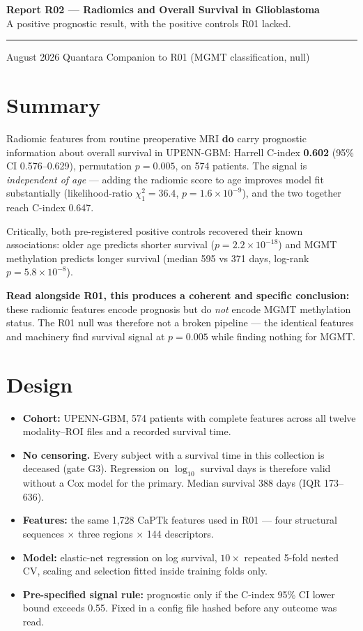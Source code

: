 \documentclass[11pt,a4paper]{article}
\begin{document}
\thispagestyle{empty}
\noindent
{\large\bfseries\color{qnavy} Report R02 --- Radiomics and Overall Survival in Glioblastoma}\\[2pt]
{\color{qgrey}A positive prognostic result, with the positive controls R01 lacked.}\\[6pt]
{\color{qgrey}\rule{\textwidth}{0.4pt}}

\medskip
{} August 2026 \quad\textbullet\quad Quantara \quad\textbullet\quad
Companion to R01 (MGMT classification, null)

\section*{Summary}

Radiomic features from routine preoperative MRI \textbf{do} carry prognostic information
about overall survival in UPENN-GBM: Harrell C-index \textbf{0.602} (95\% CI 0.576--0.629),
permutation $p = 0.005$, on 574 patients. The signal is \emph{independent of age} --- adding
the radiomic score to age improves model fit substantially (likelihood-ratio
$\chi^2_1 = 36.4$, $p = 1.6\times10^{-9}$), and the two together reach C-index 0.647.

Critically, both pre-registered positive controls recovered their known associations: older
age predicts shorter survival ($p = 2.2\times10^{-18}$) and MGMT methylation predicts longer
survival (median 595 vs 371 days, log-rank $p = 5.8\times10^{-8}$).

\textbf{Read alongside R01, this produces a coherent and specific conclusion:} these
radiomic features encode prognosis but do \emph{not} encode MGMT methylation status. The
R01 null was therefore not a broken pipeline --- the identical features and machinery find
survival signal at $p = 0.005$ while finding nothing for MGMT.

\section{Design}

\begin{itemize}[leftmargin=1.4em,nosep]
\item \textbf{Cohort:} UPENN-GBM, 574 patients with complete features across all twelve
modality--ROI files and a recorded survival time.
\item \textbf{No censoring.} Every subject with a survival time in this collection is
deceased (gate G3). Regression on $\log_{10}$ survival days is therefore valid without a
Cox model for the primary. Median survival 388 days (IQR 173--636).
\item \textbf{Features:} the same 1{,}728 CaPTk features used in R01 --- four structural
sequences $\times$ three regions $\times$ 144 descriptors.
\item \textbf{Model:} elastic-net regression on log survival, $10\times$ repeated 5-fold
nested CV, scaling and selection fitted inside training folds only.
\item \textbf{Pre-specified signal rule:} prognostic only if the C-index 95\% CI lower bound
exceeds 0.55. Fixed in a config file hashed before any outcome was read.
\end{itemize}
\end{document}
